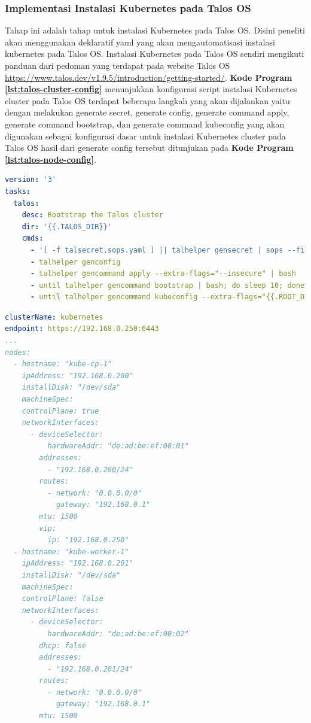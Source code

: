 \subsubsection{Implementasi Instalasi Kubernetes pada Talos OS}
Tahap ini adalah tahap untuk instalasi Kubernetes pada Talos OS. Disini
peneliti akan menggunakan deklaratif yaml yang akan mengautomatisasi instalasi
kubernetes pada Talos OS. Instalasi Kubernetes pada Talos OS sendiri mengikuti
panduan dari pedoman yang terdapat pada website Talos OS
\url{https://www.talos.dev/v1.9.5/introduction/getting-started/}. \textbf{Kode
  Program \ref{lst:talos-cluster-config}} menunjukkan konfigurasi script
instalasi Kubernetes cluster pada Talos OS terdapat beberapa langkah yang akan
dijalankan yaitu dengan melakukan generate secret, generate config, generate
command apply, generate command bootstrap, dan generate command kubeconfig yang
akan digunakan sebagai konfigurasi dasar untuk instalasi Kubernetes cluster
pada Talos OS hasil dari generate config tersebut ditunjukan pada \textbf{Kode
  Program \ref{lst:talos-node-config}}.

\begin{lstlisting}[language=yaml, 
  basicstyle=\footnotesize\ttfamily, 
  caption={Konfigurasi script instalasi Kubernetes cluster pada Talos OS}, 
  label={lst:talos-cluster-config}]
version: '3'
tasks:
  talos:
    desc: Bootstrap the Talos cluster
    dir: '{{.TALOS_DIR}}'
    cmds:
      - '[ -f talsecret.sops.yaml ] || talhelper gensecret | sops --filename-override talos/talsecret.sops.yaml --encrypt /dev/stdin > talsecret.sops.yaml'
      - talhelper genconfig
      - talhelper gencommand apply --extra-flags="--insecure" | bash
      - until talhelper gencommand bootstrap | bash; do sleep 10; done
      - until talhelper gencommand kubeconfig --extra-flags="{{.ROOT_DIR}} --force" | bash; do sleep 10; done
\end{lstlisting}
\begin{lstlisting}[language=yaml, 
  basicstyle=\footnotesize\ttfamily, 
  caption={Konfigurasi node Kubernetes cluster pada Talos OS}, 
  label={lst:talos-node-config}]
clusterName: kubernetes
endpoint: https://192.168.0.250:6443
...
nodes:
  - hostname: "kube-cp-1"
    ipAddress: "192.168.0.200"
    installDisk: "/dev/sda"
    machineSpec:
    controlPlane: true
    networkInterfaces:
      - deviceSelector:
          hardwareAddr: "de:ad:be:ef:00:01"
        addresses:
          - "192.168.0.200/24"
        routes:
          - network: "0.0.0.0/0"
            gateway: "192.168.0.1"
        mtu: 1500
        vip:
          ip: "192.168.0.250"
  - hostname: "kube-worker-1"
    ipAddress: "192.168.0.201"
    installDisk: "/dev/sda"
    machineSpec:
    controlPlane: false
    networkInterfaces:
      - deviceSelector:
          hardwareAddr: "de:ad:be:ef:00:02"
        dhcp: false
        addresses:
          - "192.168.0.201/24"
        routes:
          - network: "0.0.0.0/0"
            gateway: "192.168.0.1"
        mtu: 1500
\end{lstlisting}

